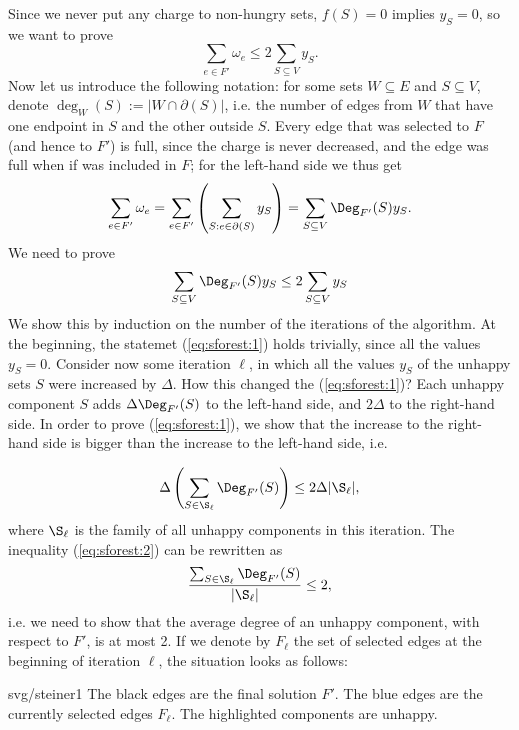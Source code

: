 \begin{dokaz}
  Since we never put any charge to non-hungry sets, $f(S)=0$ implies $y_S=0$, so we want to prove
  $$\sum_{e\in F'}\omega_e \le 2 \sum_{S\subseteq V}y_S.$$ 
  Now let us introduce the following notation: for some sets $W\subseteq E$ and  $S\subseteq V$,
  denote  $\deg_W(S):=|W\cap\partial(S)|$, i.e. the number of edges from $W$ that have one endpoint in
  $S$ and the other outside $S$. Every edge that was selected to $F$ (and hence to $F'$) is full, since
  the charge is never decreased, and the edge was full when if was included in $F$; for the left-hand side we thus
  get
  $$\sum_{e\in F'}\omega_e=\sum_{e\in F'}\left(\sum_{S:e\in\partial(S)}y_S\right)
  =\sum_{S\subseteq V}\Deg_{F'}(S)y_S
  .$$
  We need to prove
  \begin{equation}
    \label{eq:sforest:1}
    \sum_{S\subseteq V}\Deg_{F'}(S)y_S\le 2 \sum_{S\subseteq V}y_S
  \end{equation}
  We show this by induction on the number of the iterations of the algorithm. At the beginning, the statemet
  (\ref{eq:sforest:1}) holds trivially, since all the values $y_S=0$. Consider now some iteration $\ell$, in which 
  all the values $y_S$ of the unhappy sets $S$ were increased by $\Delta$. How this changed the (\ref{eq:sforest:1})?
  Each unhappy component $S$ adds  $\Delta\Deg_{F'}(S)$ to the left-hand side, and  $2\Delta$ to the right-hand side.
  In order to prove  (\ref{eq:sforest:1}), we show that the increase to the right-hand side is bigger than the
  increase to the left-hand side, i.e.

  \begin{equation}
     \label{eq:sforest:2}
  \Delta\left(\sum_{S\in\S_\ell}\Deg_{F'}(S)\right)
  \le 2\Delta|\S_\ell|,
\end{equation}
where $\S_\ell$ is the family of all unhappy components in this iteration. The inequality  (\ref{eq:sforest:2})
can be rewritten as 
  $$\frac{\sum_{S\in\S_\ell}\Deg_{F'}(S)}{|\S_\ell|}\le2,$$
i.e. we need to show that the average degree of an unhappy component, with respect to $F'$, is at most 2.
If we denote by $F_\ell$ the set of selected edges at the beginning of iteration $\ell$, the situation looks as 
follows:


\begin{myfig}{0.8\textwidth}{svg/steiner1}
  The black edges are the final solution $F'$. The blue edges are the currently selected edges $F_\ell$.
  The highlighted components are unhappy.
\end{myfig}


\end{dokaz}
